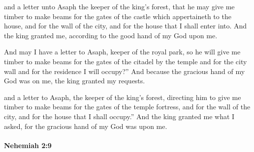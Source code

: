 			\begin{versebox}
					\item[BHS] 
					\item[LXX] 
					\item[ASV] and a letter unto Asaph the keeper of the king's forest, that he may give me timber to make beams for the gates of the castle which appertaineth to the house, and for the wall of the city, and for the house that I shall enter into. And the king granted me, according to the good hand of my God upon me.
					\item[NIV] And may I have a letter to Asaph, keeper of the royal park, so he will give me timber to make beams for the gates of the citadel by the temple and for the city wall and for the residence I will occupy?” And because the gracious hand of my God was on me, the king granted my requests.
					\item[NRSV] and a letter to Asaph, the keeper of the king’s forest, directing him to give me timber to make beams for the gates of the temple fortress, and for the wall of the city, and for the house that I shall occupy.” And the king granted me what I asked, for the gracious hand of my God was upon me.
			\end{versebox}

		\paragraph{Nehemiah 2:9} %
			\label{NEHEMIAH-2-9}

